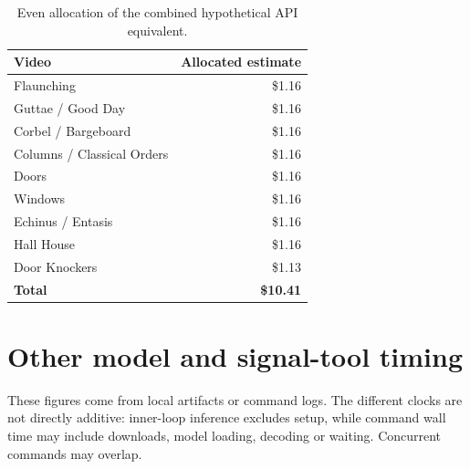 \documentclass[10pt]{article}
\begin{document}
\begin{table}[ht]
\centering\small
\caption{Even allocation of the combined hypothetical API equivalent.}
\begin{tabular}{lr}
\toprule\textbf{Video} & \textbf{Allocated estimate}\\\midrule
Flaunching & \$1.16\\
Guttae / Good Day & \$1.16\\
Corbel / Bargeboard & \$1.16\\
Columns / Classical Orders & \$1.16\\
Doors & \$1.16\\
Windows & \$1.16\\
Echinus / Entasis & \$1.16\\
Hall House & \$1.16\\
Door Knockers & \$1.13\\
\midrule\textbf{Total} & \textbf{\$10.41}\\
\bottomrule
\end{tabular}
\end{table}

\section{Other model and signal-tool timing}
These figures come from local artifacts or command logs. The different clocks are not directly additive: inner-loop inference excludes setup, while command wall time may include downloads, model loading, decoding or waiting. Concurrent commands may overlap.
\end{document}
